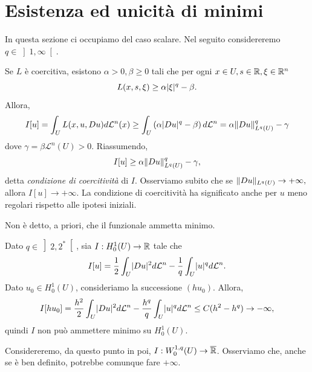 \section{Esistenza ed unicità di minimi}
In questa sezione ci occupiamo del caso scalare. Nel seguito considereremo $q \in \left] 1,\infty\right[ $.

Se $L$ è coercitiva, esistono $\alpha>0,\beta \ge 0$ tali che per ogni $x \in U, s \in \mathbb{R},\xi \in \mathbb{R}^n$
\[ L(x,s,\xi) \ge \alpha\lvert\xi\rvert^q-\beta. \]
Allora, 
\[ I[u] = \int_U L(x,u,Du)d\mathcal{L}^n(x) \ge \int_U \left(\alpha\lvert Du\rvert^q-\beta\right)d\mathcal{L}^n = \alpha \lVert Du\rVert_{L^q(U)}^q -\gamma  \]
dove $\gamma = \beta \mathcal{L}^n(U) >0$. Riassumendo,
\begin{equation}
	I[u] \ge \alpha \lVert Du\rVert_{L^q(U)}^q -\gamma,
\end{equation}
detta \emph{condizione di coercitività} di $I$. Osserviamo subito che se $\lVert Du\rVert_{L^q(U)} \to +\infty,$ allora $I[u] \to +\infty$. La condizione di coercitività ha significato anche per $u$ meno regolari rispetto alle ipotesi iniziali. 

Non è detto, a priori, che il funzionale ammetta minimo.
\begin{esempio}
	Dato $ q \in \left] 2,2^\ast\right[$, sia $I: H^1_0(U) \to \mathbb{R}$ tale che 
	\[ I[u] = \frac{1}{2}\int_U \lvert Du\rvert^2 d\mathcal{L}^n - \frac{1}{q}\int_U \lvert u\rvert^q d\mathcal{L}^n. \]
	Dato $u_0 \in H^1_0(U)$, consideriamo la successione $(hu_0)$. Allora,
	\[ I[hu_0] = \frac{h^2}{2}\int_U \lvert Du\rvert^2 d\mathcal{L}^n - \frac{h^q}{q}\int_U \lvert u\rvert^q d\mathcal{L}^n \le C(h^2 - h^q) \to -\infty, \]
	quindi $I$ non può ammettere minimo su $H^1_0(U)$.
\end{esempio}
Considereremo, da questo punto in poi, $I: W^{1,q}_0(U) \to \overline{\mathbb{R}}$. Osserviamo che, anche se è ben definito, potrebbe comunque fare $+\infty$.


